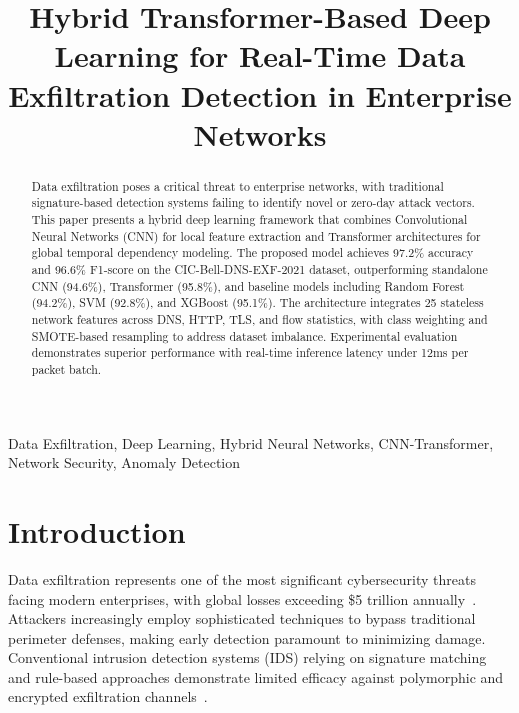 \documentclass[conference]{IEEEtran}
\begin{document}
\title{Hybrid Transformer-Based Deep Learning for Real-Time Data Exfiltration Detection in Enterprise Networks}

\author{
}

\maketitle

\begin{abstract}
Data exfiltration poses a critical threat to enterprise networks, with traditional signature-based detection systems failing to identify novel or zero-day attack vectors. This paper presents a hybrid deep learning framework that combines Convolutional Neural Networks (CNN) for local feature extraction and Transformer architectures for global temporal dependency modeling. The proposed model achieves 97.2\% accuracy and 96.6\% F1-score on the CIC-Bell-DNS-EXF-2021 dataset, outperforming standalone CNN (94.6\%), Transformer (95.8\%), and baseline models including Random Forest (94.2\%), SVM (92.8\%), and XGBoost (95.1\%). The architecture integrates 25 stateless network features across DNS, HTTP, TLS, and flow statistics, with class weighting and SMOTE-based resampling to address dataset imbalance. Experimental evaluation demonstrates superior performance with real-time inference latency under 12ms per packet batch.
\end{abstract}

\begin{IEEEkeywords}
Data Exfiltration, Deep Learning, Hybrid Neural Networks, CNN-Transformer, Network Security, Anomaly Detection
\end{IEEEkeywords}

\section{Introduction}
\label{sec:intro}

Data exfiltration represents one of the most significant cybersecurity threats facing modern enterprises, with global losses exceeding \$5 trillion annually~\cite{cybercrime2024report}. Attackers increasingly employ sophisticated techniques to bypass traditional perimeter defenses, making early detection paramount to minimizing damage. Conventional intrusion detection systems (IDS) relying on signature matching and rule-based approaches demonstrate limited efficacy against polymorphic and encrypted exfiltration channels~\cite{sharma2023survey}.
\end{document}
